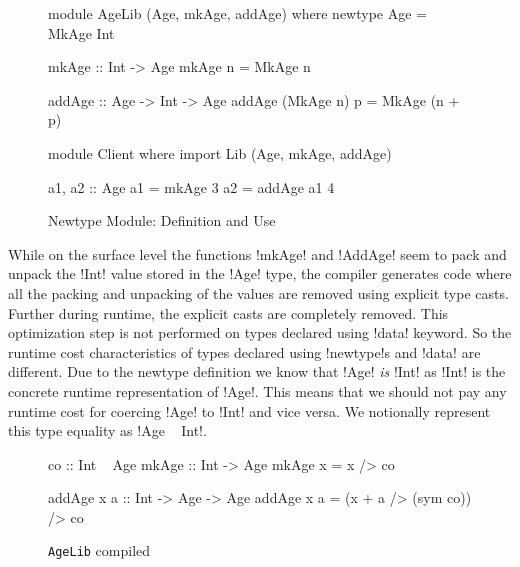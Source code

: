 \documentclass[manuscript,screen,nonacm]{acmart}
\begin{document}
\begin{figure}[ht]
  \centering
  \begin{minipage}[ht]{0.5\linewidth}
    \begin{code}
      module AgeLib (Age, mkAge, addAge) where
      newtype Age = MkAge Int

      mkAge :: Int -> Age
      mkAge n = MkAge n

      addAge :: Age -> Int -> Age
      addAge (MkAge n) p = MkAge (n + p)
    \end{code}
  \end{minipage}%
  \begin{minipage}[ht]{0.4\linewidth}
    \begin{code}
      module Client where
      import Lib (Age, mkAge, addAge)

      a1, a2 :: Age
      a1 = mkAge 3
      a2 = addAge a1 4


    \end{code}
  \end{minipage}
  \caption{Newtype Module: Definition and Use}
  \label{fig:newtype-modules}
\end{figure}
While on the surface level the functions !mkAge! and !AddAge! seem to pack and unpack
the !Int! value stored in the !Age! type, the compiler generates code where all the packing and unpacking of the values are removed using explicit type casts. Further during runtime, the explicit casts are completely removed. This optimization step is not performed on types declared using !data! keyword. So the runtime cost characteristics of types declared using  !newtype!s and !data! are different. Due to the newtype definition
we know that !Age! \emph{is} !Int! as !Int! is the concrete runtime representation of !Age!. This means that we should not pay any runtime cost for coercing !Age! to !Int! and vice versa. We notionally represent this type equality as !Age ~ Int!.
\begin{figure}[ht]
  \centering
  \begin{minipage}[h]{0.4\linewidth}
    \begin{code}
      co :: Int ~ Age
      mkAge :: Int -> Age
      mkAge x = x /> co
    \end{code}
  \end{minipage}%
  \begin{minipage}[ht]{0.4\linewidth}
    \begin{code}
      addAge x a :: Int -> Age -> Age
      addAge x a = (x + a /> (sym co)) /> co
    \end{code}
  \end{minipage}
  \caption{\lstinline{AgeLib} compiled}
  \label{fig:compiled-code}
\end{figure}
\end{document}
